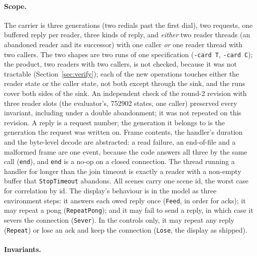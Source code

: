 \documentclass[a4paper,10pt,fleqn]{article}
\begin{document}
\paragraph{Scope.}
The carrier is three generations (two redials past the first dial), two
requests, one buffered reply per reader, three kinds of reply, and
\emph{either} two reader threads (an abandoned reader and its successor) with
one caller \emph{or} one reader thread with two callers.  The two shapes are
two runs of one specification (\texttt{-card T}, \texttt{-card C}); the product,
two readers with two callers, is not checked, because it was not tractable
(Section~\ref{sec:verify}); each of the new operations touches either the
reader state or the caller state, not both except through the sink, and the
runs cover both sides of the sink.  An independent check of the round-2
revision with three reader slots (the evaluator's, 752902 states, one
caller) preserved every invariant, including under a double abandonment; it
was not repeated on this revision.  A reply is a request number; the
generation it belongs to is the generation the request was written on.  Frame
contents, the handler's duration and the byte-level decode are abstracted: a
read failure, an end-of-file and a malformed frame are one event, because the
code answers all three by the same call (\texttt{end}), and \texttt{end} is a
no-op on a closed connection.  The thread running a handler for longer than
the join timeout is exactly a reader with a non-empty buffer that
\texttt{StopTimeout} abandons.  All scenes carry one scene id, the worst case
for correlation by id.  The display's behaviour is in the model as three
environment steps: it answers each owed reply once (\texttt{Feed}, in order
for acks); it may repeat a pong (\texttt{RepeatPong}); and it may fail to send
a reply, in which case it severs the connection (\texttt{Sever}).  In the
controls only, it may repeat any reply (\texttt{Repeat}) or lose an ack and
keep the connection (\texttt{Lose}, the display as shipped).

\paragraph{Invariants.}
\end{document}
